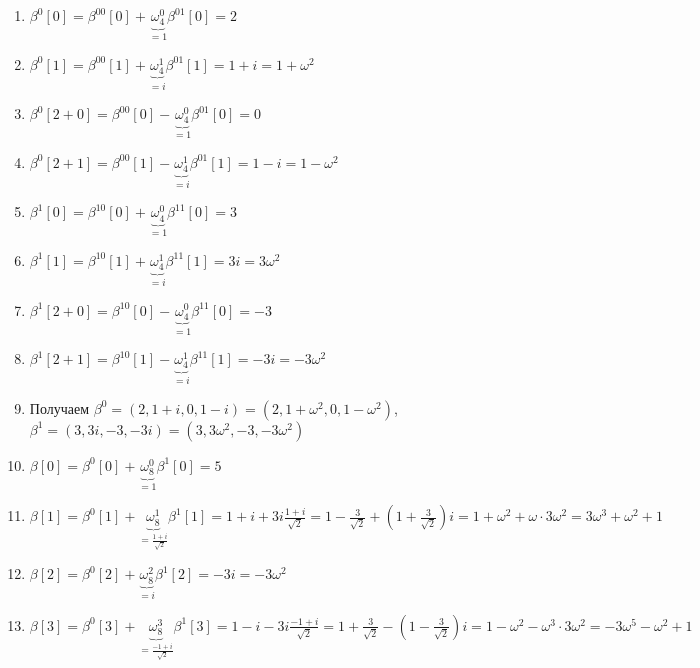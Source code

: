 \documentclass[a4paper]{article}
\begin{document}
\begin{enumerate}
\begin{enumerate}
\item $\beta^0[0]=\beta^{00}[0]+\underbrace{\omega_4^0}_{=1}\beta^{01}[0]=2$
\item $\beta^0[1]=\beta^{00}[1]+\underbrace{\omega_4^1}_{=i}\beta^{01}[1]=1+i=1+\omega^2$
\item $\beta^0[2+0]=\beta^{00}[0]-\underbrace{\omega_4^0}_{=1}\beta^{01}[0]=0$
\item $\beta^0[2+1]=\beta^{00}[1]-\underbrace{\omega_4^1}_{=i}\beta^{01}[1]=1-i=1-\omega^2$
\newpage
\item $\beta^1[0]=\beta^{10}[0]+\underbrace{\omega_4^0}_{=1}\beta^{11}[0]=3$
\item $\beta^1[1]=\beta^{10}[1]+\underbrace{\omega_4^1}_{=i}\beta^{11}[1]=3i=3\omega^2$
\item $\beta^1[2+0]=\beta^{10}[0]-\underbrace{\omega_4^0}_{=1}\beta^{11}[0]=-3$
\item $\beta^1[2+1]=\beta^{10}[1]-\underbrace{\omega_4^1}_{=i}\beta^{11}[1]=-3i=-3\omega^2$
\item Получаем $\beta^0=(2,1+i,0,1-i)=(2,1+\omega^2,0,1-\omega^2)$, $\beta^1=(3,3i,-3,-3i)=(3,3\omega^2,-3,-3\omega^2)$
\item $\beta[0]=\beta^0[0]+\underbrace{\omega_8^0}_{=1}\beta^1[0]=5$
\item $\beta[1]=\beta^0[1]+\underbrace{\omega_8^1}_{=\frac{1+i}{\sqrt{2}}}\beta^1[1]=1+i+3i\frac{1+i}{\sqrt{2}}=1-\frac{3}{\sqrt{2}}+(1+\frac{3}{\sqrt{2}})i=1+\omega^2+\omega\cdot 3\omega^2=3\omega^3+\omega^2+1$
\item $\beta[2]=\beta^0[2]+\underbrace{\omega_8^2}_{=i}\beta^1[2]=-3i=-3\omega^2$
\item $\beta[3]=\beta^0[3]+\underbrace{\omega_8^3}_{=\frac{-1+i}{\sqrt{2}}}\beta^1[3]=1-i-3i\frac{-1+i}{\sqrt{2}}=1+\frac{3}{\sqrt{2}}-(1-\frac{3}{\sqrt{2}})i=1-\omega^2-\omega^3\cdot 3\omega^2=-3\omega^5-\omega^2+1$


\end{enumerate}
\end{enumerate}
\end{document}
